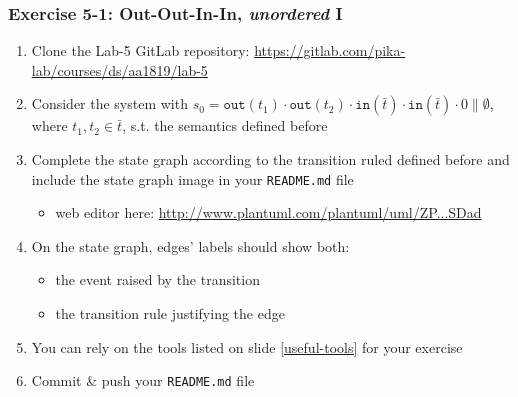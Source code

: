 \documentclass[presentation]{beamer}\mode<presentation>{\usetheme{AMSCesenaPurpleAndGold}}
\begin{document}
\begin{frame}
\frametitle{Exercise 5-1: Out-Out-In-In, \emph{unordered} I}
    \begin{enumerate}
        \item Clone the Lab-5 GitLab repository: \url{https://gitlab.com/pika-lab/courses/ds/aa1819/lab-5}
        
        \vfill
        
        \item Consider the system with \alert{$s_0 = \mathtt{out}(t_1) \cdot \mathtt{out}(t_2) \cdot \mathtt{in}(\bar t) \cdot \mathtt{in}(\bar t) \cdot 0  \parallel \emptyset$}, where $t_1, t_2 \in \bar{t}$, s.t. the \linda{} semantics defined before
        
        \vfill
    
        \item Complete the state graph according to the transition ruled defined before and include the state graph image in your \alert{\texttt{README.md}} file
        \begin{itemize}
            \item web editor here: \href{
                http://www.plantuml.com/plantuml/uml/ZPBVJl8m6CRFUnNl8Nm9P8m_4488-H0JJp0HE48E6bQneMkNjLFHUE22YGVSXWToBIRU0rTYHvakSpWFbhNls-VtF6_JdbJOLu7Ba5nIxc4Vkt12hd30rAdWQaJl2TXMeZbIM95zIwqO0QemetEPhHvYbq1V13ubFhgc3W7YUce53f5pdtgA2euIIXcXuG41_CVpvS8N0NVwWWc_qnbmX_95jmk2qHkITMB2oPsdLyJHfrQ4CN6B7X6Q_fj1gTG5QI63brORHA0AQXS-5Sk7LLWiKrvGx-lllmMxbrVzFIDf6K8b8Rpaq_F9MAzco71DEu-sUOlKkyqMoOg1sctuM6lQsN0qk1ZFlkhL12t3p8PyjyWAITlmQl0xiAhxUQ7rTdlOXliPgWTsQeQuNa_LZPV9SZpo3vUQeJMCoDo-PkxZnytc4QlwNyUAt92iPzFYUYkE42OYn5ODI3t2Ti8ZqzoCPzJDj3hlYapYMDxADZSUnrzXZt0dSDad
            }{http://www.plantuml.com/plantuml/uml/ZP...SDad}
        \end{itemize}
        
        \vfill
        
        \item On the state graph, edges' labels should show both:
        \begin{itemize}
            \item the event raised by the transition
            \item the transition rule justifying the edge
        \end{itemize}
        
        \vfill
        
        \item You can rely on the tools listed on slide \ref{useful-tools} for your exercise
        
        \vfill
        
        \item Commit \& push your \texttt{README.md} file
        
    \end{enumerate}
    
\end{frame}
\end{document}

